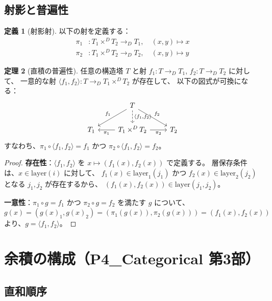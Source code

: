 \documentclass[a4paper,11pt]{ltjsarticle}
\theoremstyle{definition}
\newtheorem{definition}{定義}[section]
\newtheorem{theorem}[definition]{定理}
\begin{document}
\subsection{射影と普遍性}

\begin{definition}[射影射]
以下の射を定義する：
\begin{align*}
  \pi_1 &: T_1 \times^D T_2 \to_D T_1, \quad (x, y) \mapsto x \\
  \pi_2 &: T_1 \times^D T_2 \to_D T_2, \quad (x, y) \mapsto y
\end{align*}
\end{definition}

\begin{theorem}[直積の普遍性]
任意の構造塔 $T$ と射 $f_1 : T \to_D T_1$, $f_2 : T \to_D T_2$ に対して、
一意的な射 $\langle f_1, f_2 \rangle : T \to_D T_1 \times^D T_2$ が存在して、
以下の図式が可換になる：
\[
\begin{tikzcd}
  & T \arrow[ld, "f_1"'] \arrow[rd, "f_2"] \arrow[d, dashed, "{\langle f_1, f_2 \rangle}"] & \\
T_1 & T_1 \times^D T_2 \arrow[l, "\pi_1"] \arrow[r, "\pi_2"'] & T_2
\end{tikzcd}
\]
すなわち、$\pi_1 \circ \langle f_1, f_2 \rangle = f_1$ かつ $\pi_2 \circ \langle f_1, f_2 \rangle = f_2$。
\end{theorem}

\begin{proof}
\textbf{存在性}：$\langle f_1, f_2 \rangle$ を $x \mapsto (f_1(x), f_2(x))$ で定義する。
層保存条件は、$x \in \mathrm{layer}(i)$ に対して、
$f_1(x) \in \mathrm{layer}_1(j_1)$ かつ $f_2(x) \in \mathrm{layer}_2(j_2)$ となる $j_1, j_2$ が存在するから、
$(f_1(x), f_2(x)) \in \mathrm{layer}(j_1, j_2)$。

\textbf{一意性}：$\pi_1 \circ g = f_1$ かつ $\pi_2 \circ g = f_2$ を満たす $g$ について、
$g(x) = (g(x)_1, g(x)_2) = (\pi_1(g(x)), \pi_2(g(x))) = (f_1(x), f_2(x))$
より、$g = \langle f_1, f_2 \rangle$。
\end{proof}

\section{余積の構成（P4\_Categorical 第3部）}

\subsection{直和順序}
\end{document}
